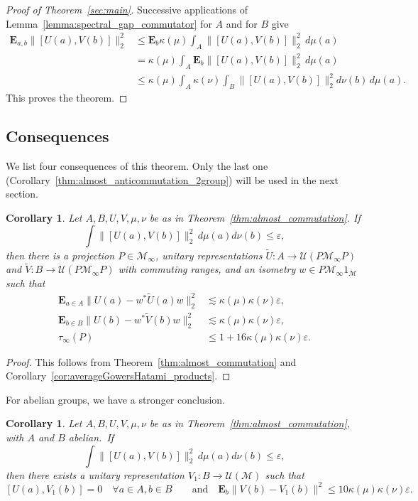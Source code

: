 \documentclass[JEP,XML,SOM,Unicode,published]{cedram}
\theoremstyle{plain}
\newtheorem{corollary}[theorem]{Corollary}
\theoremstyle{definition}
\newcommand{\cM}{\mathcal{M}}
\newcommand{\E}{\mathbf{E}}
\newcommand{\cU}{\mathcal{U}}
\begin{document}
\begin{proof}[Proof of Theorem~\ref{sec:main}] Successive applications of Lemma~\ref{lemma:spectral_gap_commutator} for $A$ and for $B$ give
\begin{align*}\E_{a,b} \|[U(a),V(b)]\|_2^2 & \leq \E_b \kappa(\mu) \int_A \|[U(a),V(b)]\|_2^2 \,d\mu(a)\\
& = \kappa(\mu) \int_A \E_b \|[U(a),V(b)]\|_2^2 \,d\mu(a)\\
& \leq \kappa(\mu) \int_A \kappa(\nu) \int_B \|[U(a),V(b)]\|_2^2 d\nu(b) \,d\mu(a).
\end{align*}
This proves the theorem.
\end{proof}

\subsection{Consequences}
We list four consequences of this theorem. Only the last one (Corollary~\ref{thm:almost_anticommutation_2group}) will be used in the next section.
\begin{corollary} Let $A,B,U,V,\mu,\nu$ be as in Theorem~\ref{thm:almost_commutation}. If
\[
\int \| [U(a),V(b)]\|_2^2 \,d\mu(a) d\nu(b) \leq \varepsilon,
\]
then there is a projection $P \in \cM_\infty$, unitary representations $\tilde{U}: A \to \cU(P\cM_\infty P)$ and $\tilde{V}: B \to \cU(P\cM_\infty P)$ with commuting ranges, and an isometry $w \in P \cM_\infty 1_\cM$ such that
\begin{align*}
\E_{a \in A} \|U(a)-w^* \tilde U(a) w\|_2^2&\lesssim \kappa(\mu)\kappa(\nu)\varepsilon,
\\
\E_{b \in B} \|U(b)-w^* \tilde V(b) w\|_2^2&\lesssim \kappa(\mu)\kappa(\nu)\varepsilon,
\\
\tau_\infty(P)&\leq 1+ 16\kappa(\mu)\kappa(\nu) \varepsilon.
\end{align*}
\end{corollary}
\begin{proof}
This follows from Theorem~\ref{thm:almost_commutation} and
Corollary~\ref{cor:averageGowersHatami_products}.\end{proof} For
abelian groups, we have a stronger conclusion.
\begin{corollary}\label{thm:almost_commutationbis}
Let $A,B,U,V,\mu,\nu$ be as in Theorem~\ref{thm:almost_commutation}, with $A$ and $B$ abelian.~If
\[
\int \|[U(a),V(b)]\|_2^2 \,d\mu(a) d\nu(b) \leq \varepsilon,
\]
then there exists a unitary representation $V_1:B \to \cU(\cM)$ such that
\[
[U(a),V_1(b)] = 0 \quad \forall a \in A,b\in B
\qquad
\text{and}
\quad
\E_b \|V(b) - V_1(b)\|^2 \leq 10\kappa(\mu) \kappa(\nu) \varepsilon.
\]
\end{corollary}
\end{document}
